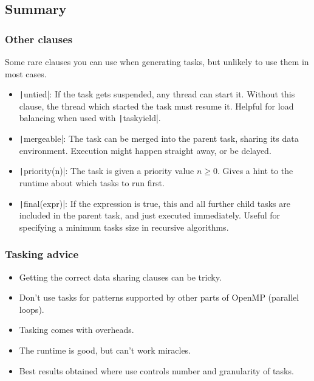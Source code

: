 \documentclass{beamer}
\begin{document}
\subsection{Summary}
\begin{frame}
\frametitle{Other clauses}
Some rare clauses you can use when generating tasks, but unlikely to use them in most cases.
\begin{itemize}
  \item \texttt|untied|: If the task gets suspended, any thread can start it. Without this clause, the thread which started the task must resume it. Helpful for load balancing when used with \texttt|taskyield|.
  \item \texttt|mergeable|: The task can be merged into the parent task, sharing its data environment. Execution might happen straight away, or be delayed.
  \item \texttt|priority(n)|: The task is given a priority value $n \ge 0$. Gives a hint to the runtime about which tasks to run first.
  \item \texttt|final(expr)|: If the expression is true, this and all further child tasks are included in the parent task, and just executed immediately. Useful for specifying a minimum tasks size in recursive algorithms.
\end{itemize}
\end{frame}
\begin{frame}
\frametitle{Tasking advice}
\begin{itemize}
  \item Getting the correct data sharing clauses can be tricky.
  \item Don't use tasks for patterns supported by other parts of OpenMP (parallel loops).
  \item Tasking comes with overheads.
  \item The runtime is good, but can't work miracles.
  \item Best results obtained where use controls number and granularity of tasks.
\end{itemize}
\end{frame}

\end{document}

